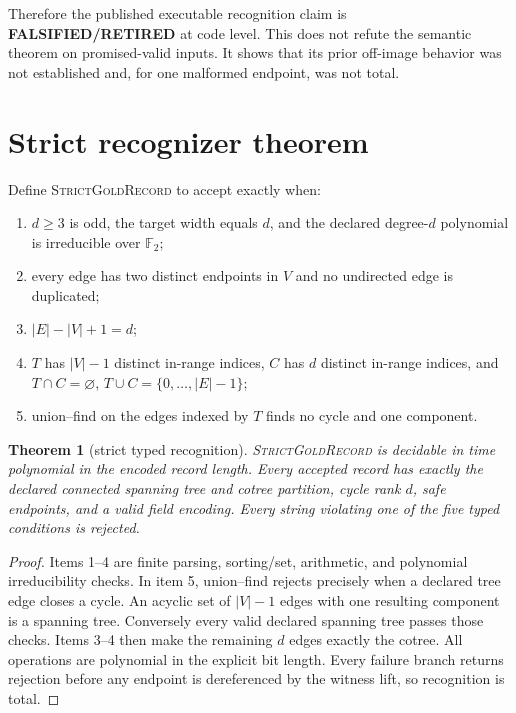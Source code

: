 \documentclass[11pt]{article}
\newtheorem{theorem}{Theorem}
\newcommand{\F}{\mathbb F_2}
\newcommand{\RET}{\textbf{FALSIFIED/RETIRED}}
\begin{document}
Therefore the published executable recognition claim is \RET{} at code level.
This does not refute the semantic theorem on promised-valid inputs.  It shows
that its prior off-image behavior was not established and, for one malformed
endpoint, was not total.

\section{Strict recognizer theorem}
Define \textsc{StrictGoldRecord} to accept exactly when:
\begin{enumerate}
\item $d\ge3$ is odd, the target width equals $d$, and the declared degree-$d$
polynomial is irreducible over $\F$;
\item every edge has two distinct endpoints in $V$ and no undirected edge is
duplicated;
\item $|E|-|V|+1=d$;
\item $T$ has $|V|-1$ distinct in-range indices, $C$ has $d$ distinct
in-range indices, and $T\cap C=\varnothing$, $T\cup C=\{0,\ldots,|E|-1\}$;
\item union--find on the edges indexed by $T$ finds no cycle and one component.
\end{enumerate}

\begin{theorem}[strict typed recognition]
\textsc{StrictGoldRecord} is decidable in time polynomial in the encoded record
length.  Every accepted record has exactly the declared connected spanning
tree and cotree partition, cycle rank $d$, safe endpoints, and a valid field
encoding.  Every string violating one of the five typed conditions is rejected.
\end{theorem}
\begin{proof}
Items 1--4 are finite parsing, sorting/set, arithmetic, and polynomial
irreducibility checks.  In item 5, union--find rejects precisely when a declared
tree edge closes a cycle.  An acyclic set of $|V|-1$ edges with one resulting
component is a spanning tree.  Conversely every valid declared spanning tree
passes those checks.  Items 3--4 then make the remaining $d$ edges exactly the
cotree.  All operations are polynomial in the explicit bit length.  Every
failure branch returns rejection before any endpoint is dereferenced by the
witness lift, so recognition is total.
\end{proof}
\end{document}
